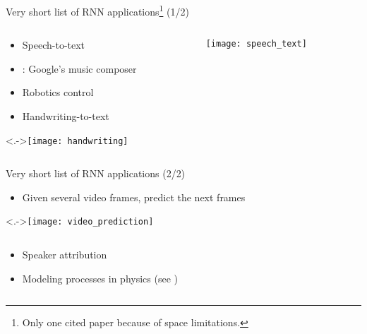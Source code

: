 \setcounter{footnote}{0}

\begin{frame}{%
    Very short list of RNN applications\footnote{%
        Only one cited paper because of space limitations.%
    } (1/2)%
}
    \begin{columns}
        \begin{column}{0.63\textwidth}
            \begin{itemize}[<+->]
                \item Speech-to-text \citep{Battenberg17}
                \item {}: Google's music composer \citep{performanceRNN}
                \item Robotics control \citep{WuJIRS07}
                \item Handwriting-to-text \citep{GravesICASSP13}
            \end{itemize}
            \vspace{5mm}

            \visible<.->{\texttt{[image: handwriting]}}
        \end{column}
        \begin{column}{0.37\textwidth}
            \texttt{[image: speech\_text]}
        \end{column}
    \end{columns}
    \vspace{2mm}
\end{frame}

\begin{frame}{Very short list of RNN applications (2/2)}
    \begin{itemize}[<+->]
        \item Given several video frames, predict the next frames
        \citep{SrivastavaICML15, Vukotic17}
    \end{itemize}
    \visible<.->{\texttt{[image: video\_prediction]}}

    \begin{columns}
        \begin{column}{0.43\textwidth}
            \begin{itemize}[<+->]
                \item Speaker attribution \citep{RenAAAICAI16}
                \item Modeling processes in physics (see )
            \end{itemize}
        \end{column}
        \begin{column}{0.5\textwidth}
            \vspace{2mm}
        \end{column}
    \end{columns}
\end{frame}

